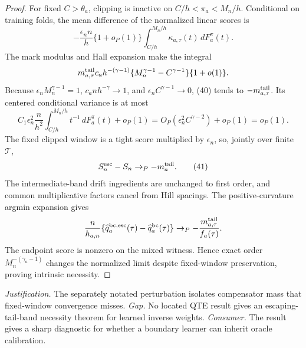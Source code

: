 \documentclass{article}
\begin{document}
\begin{proof}
For fixed \(C>\theta_a\), clipping is inactive on
\(C/h<\pi_a<M_n/h\).  Conditional on training folds, the mean difference of the normalized linear scores is
\[
-\frac{\epsilon_n n}{h}\{1+o_P(1)\}
\int_{C/h}^{M_n/h}\kappa_{a,\tau}(t)\,dF_a^\pi(t).
\tag{40}
\]
The mark modulus and Hall expansion make the integral
\[
m^{\rm tail}_{a,\tau}c_ah^{-(\gamma-1)}
\{M_n^{\gamma-1}-C^{\gamma-1}\}\{1+o(1)\}.
\]
Because \(\epsilon_nM_n^{\gamma-1}=1\), \(c_an h^{-\gamma}\to1\), and
\(\epsilon_nC^{\gamma-1}\to0\), (40) tends to
\(-m^{\rm tail}_{a,\tau}\).  Its centered conditional variance is at most
\[
C_1\epsilon_n^2\frac n{h^2}\int_{C/h}^{M_n/h}t^{-1}\,dF_a^\pi(t)+o_P(1)
=O_P(\epsilon_n^2C^{\gamma-2})+o_P(1)=o_P(1).
\]
The fixed clipped window is a tight score multiplied by \(\epsilon_n\), so, jointly over finite \(\mathcal T\),
\[
S_n^{\rm esc}-S_n\to_P-m_a^{\rm tail}.
\tag{41}
\]
The intermediate-band drift ingredients are unchanged to first order, and common multiplicative factors cancel from Hill spacings.  The positive-curvature argmin expansion gives
\[
\frac n{h_{a,n}}\{\widehat q_a^{\rm bc,esc}(\tau)
-\widehat q_a^{\rm bc}(\tau)\}
\to_P-\frac{m^{\rm tail}_{a,\tau}}{f_a(\tau)}.
\]
The endpoint score is nonzero on the mixed witness.  Hence exact order
\(M_n^{-(\gamma_a-1)}\) changes the normalized limit despite fixed-window preservation, proving intrinsic necessity.
\end{proof}
\par\smallskip\noindent \textit{Justification.} The separately notated perturbation isolates compensator mass that fixed-window convergence misses. \textit{Gap.} No located QTE result gives an escaping-tail-band necessity theorem for learned inverse weights. \textit{Consumer.} The result gives a sharp diagnostic for whether a boundary learner can inherit oracle calibration.
\end{document}
